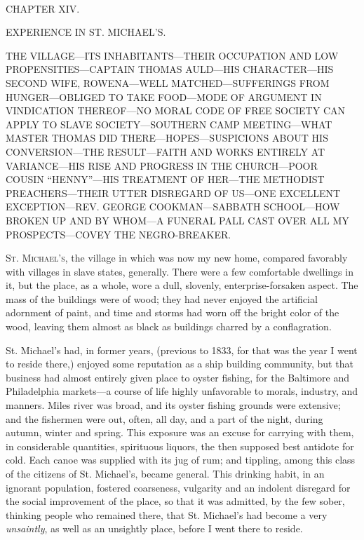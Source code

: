 {}

~

{CHAPTER XIV.}

EXPERIENCE IN ST. MICHAEL'S.

{THE VILLAGE---ITS INHABITANTS---THEIR OCCUPATION AND LOW
PROPENSITIES---CAPTAIN THOMAS AULD---HIS CHARACTER---HIS SECOND WIFE,
ROWENA---WELL MATCHED---SUFFERINGS FROM HUNGER---OBLIGED TO TAKE
FOOD---MODE OF ARGUMENT IN VINDICATION THEREOF---NO MORAL CODE OF FREE
SOCIETY CAN APPLY TO SLAVE SOCIETY---SOUTHERN CAMP MEETING---WHAT MASTER
THOMAS DID THERE---HOPES---SUSPICIONS ABOUT HIS CONVERSION---THE
RESULT---FAITH AND WORKS ENTIRELY AT VARIANCE---HIS RISE AND PROGRESS IN
THE CHURCH---POOR COUSIN ``HENNY''---HIS TREATMENT OF HER---THE
METHODIST PREACHERS---THEIR UTTER DISREGARD OF US---ONE EXCELLENT
EXCEPTION---REV. GEORGE COOKMAN---SABBATH SCHOOL---HOW BROKEN UP AND BY
WHOM---A FUNERAL PALL CAST OVER ALL MY PROSPECTS---COVEY THE
NEGRO-BREAKER.}

\textsc{St. Michael's}, the village in which was now my new home,
compared favorably with villages in slave states, generally. There were
a few comfortable dwellings in it, but the place, as a whole, wore a
dull, slovenly, enterprise-forsaken aspect. The mass of the buildings
were of wood; they had never enjoyed the artificial adornment of paint,
and time and storms had worn off the bright color of the wood, leaving
them almost as black as buildings charred by a conflagration.

St. Michael's had, in former years, (previous to 1833, for that was the
year I went to reside there,) enjoyed some reputation as a ship building
community, but that business had almost entirely given place to oyster
fishing, for the Baltimore and Philadelphia markets---a course of life
highly unfavorable to morals, {}industry, and manners. Miles river was
broad, and its oyster fishing grounds were extensive; and the fishermen
were out, often, all day, and a part of the night, during autumn, winter
and spring. This exposure was an excuse for carrying with them, in
considerable quantities, spirituous liquors, the then supposed best
antidote for cold. Each canoe was supplied with its jug of rum; and
tippling, among this class of the citizens of St. Michael's, became
general. This drinking habit, in an ignorant population, fostered
coarseness, vulgarity and an indolent disregard for the social
improvement of the place, so that it was admitted, by the few sober,
thinking people who remained there, that St. Michael's had become a very
\emph{unsaintly}, as well as an unsightly place, before I went there to
reside.

